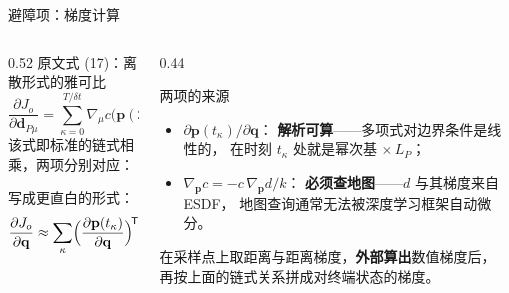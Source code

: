 \begin{frame}{避障项：梯度计算}
  \small
  \begin{columns}[t]
    \begin{column}{0.52\textwidth}
      原文式 (17)：离散形式的雅可比
      \[
        \frac{\partial J_o}{\partial\mathbf d_{P\mu}}
        =\sum_{\kappa=0}^{T/\delta t}
        \nabla_\mu c\bigl(\mathbf p(\mathcal T_\kappa)\bigr)\,
        \mathbf T\,\mathbf L_P\,\delta t
      \]
      该式即标准的链式相乘，两项分别对应：

      \vspace{0.3em}
      \begin{center}
      \end{center}
      \vspace{-0.2em}
      写成更直白的形式：
      \[
        \frac{\partial J_o}{\partial\mathbf q}
        \approx\sum_\kappa
        \Bigl(\frac{\partial\mathbf p(t_\kappa)}{\partial\mathbf q}\Bigr)^{\!\mathsf T}
        \nabla_{\mathbf p}c\;\delta t
      \]
    \end{column}
    \begin{column}{0.44\textwidth}
      \begin{block}{两项的来源}
        \footnotesize
        \begin{itemize}\tight
          \item $\partial\mathbf p(t_\kappa)/\partial\mathbf q$：
                \textbf{解析可算}——多项式对边界条件是线性的，
                在时刻 $t_\kappa$ 处就是幂次基 $\times\,L_P$；
          \item $\nabla_{\mathbf p}c=-c\,\nabla_{\mathbf p}d/k$：
                \textbf{必须查地图}——$d$ 与其梯度来自 ESDF，
                地图查询通常无法被深度学习框架自动微分。
        \end{itemize}
      \end{block}
      \begin{reading}[实现上的做法]
        \small
        在采样点上取距离与距离梯度，\textbf{外部算出}数值梯度后，
        再按上面的链式关系拼成对终端状态的梯度。
      \end{reading}
    \end{column}
  \end{columns}
\end{frame}

